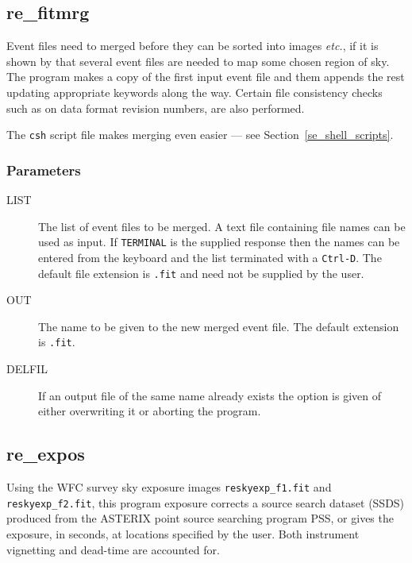 \subsection{\label{ss_re_fitmrg}re\_fitmrg}	

Event files need to merged before they can be sorted into images
\emph{etc.}, if it is shown by 
that several event files are needed to map some chosen region of sky.
The program makes a copy of the first input event file and them appends
the rest updating appropriate keywords along the way.  Certain file
consistency checks such as on data format revision numbers, are also
performed.

The {\tt csh} script file 
makes merging even easier --- see Section~\ref{se_shell_scripts}.

\subsubsection{Parameters}

\begin{description}

\item[LIST  ] 
The list of event files to be merged.  A text file containing file
names can be used as input.  If {\tt TERMINAL} is the supplied response
then the names can be entered from the keyboard and the list terminated
with a {\tt Ctrl-D}.  The default file extension is {\tt .fit} and need
not be supplied by the user.
\item[OUT  ] 
The name to be given to the new merged event file.  The default extension is 
{\tt .fit}.
\item[DELFIL ] 
If an output file of the same name already exists the option is given of
either overwriting it or aborting the program.
\end{description}

\subsection{\label{ss_re_expos}re\_expos}

Using the \ro WFC survey sky exposure images {\tt reskyexp\_f1.fit} and
{\tt reskyexp\_f2.fit}, this program exposure corrects a source search
dataset (SSDS) produced from the ASTERIX point source searching program
PSS, or gives the exposure, in seconds, at locations specified by the
user. Both instrument vignetting and dead-time are accounted for.

